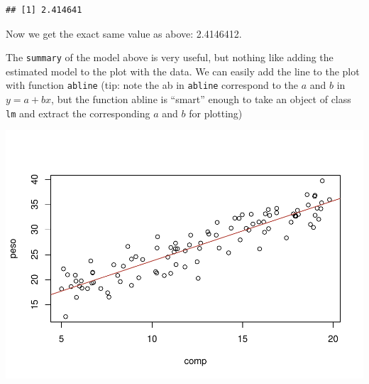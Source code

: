 \documentclass[
]{book}
\newenvironment{Shaded}{\begin{snugshade}}{\end{snugshade}}
\newcommand{\AttributeTok}[1]{\textcolor[rgb]{0.77,0.63,0.00}{#1}}
\newcommand{\CommentTok}[1]{\textcolor[rgb]{0.56,0.35,0.01}{\textit{#1}}}
\newcommand{\DecValTok}[1]{\textcolor[rgb]{0.00,0.00,0.81}{#1}}
\newcommand{\FloatTok}[1]{\textcolor[rgb]{0.00,0.00,0.81}{#1}}
\newcommand{\FunctionTok}[1]{\textcolor[rgb]{0.00,0.00,0.00}{#1}}
\newcommand{\NormalTok}[1]{#1}
\newcommand{\SpecialCharTok}[1]{\textcolor[rgb]{0.00,0.00,0.00}{#1}}
\newcommand{\StringTok}[1]{\textcolor[rgb]{0.31,0.60,0.02}{#1}}
\begin{document}
\begin{verbatim}
## [1] 2.414641
\end{verbatim}

Now we get the exact same value as above: 2.4146412.

The \texttt{summary} of the model above is very useful, but nothing like adding the estimated model to the plot with the data. We can easily add the line to the plot with function \texttt{abline} (tip: note the ab in \texttt{abline} correspond to the \(a\) and \(b\) in \(y=a+bx\), but the function abline is ``smart'' enough to take an object of class \texttt{lm} and extract the corresponding \(a\) and \(b\) for plotting)

\begin{Shaded}
\end{Shaded}

\includegraphics{ECOMODbook_files/figure-latex/a6.9-1.pdf}
\end{document}
